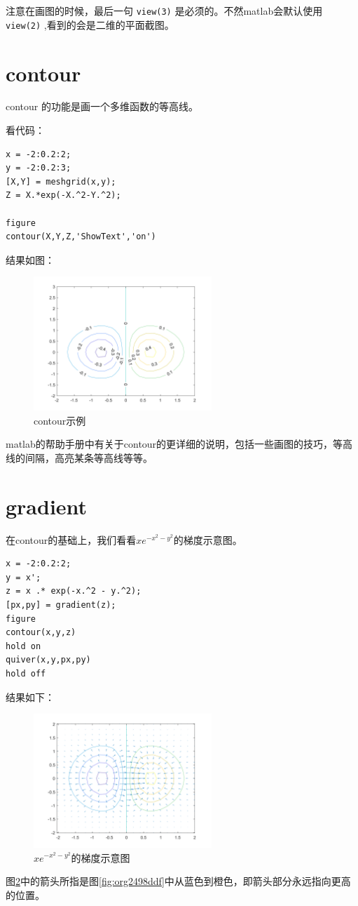 \documentclass[10pt,a4paper,UTF8]{article}
\begin{document}
注意在画图的时候，最后一句 \texttt{view(3)} 是必须的。不然matlab会默认使用 \texttt{view(2)} ,看到的会是二维的平面截图。

\section{contour}
\label{sec:orga28b7ee}


contour 的功能是画一个多维函数的等高线。

看代码：
\lstset{language=matlab,label= ,caption= ,captionpos=b,firstnumber=1,numbers=left}
\begin{lstlisting}
x = -2:0.2:2;
y = -2:0.2:3;
[X,Y] = meshgrid(x,y);
Z = X.*exp(-X.^2-Y.^2);

figure
contour(X,Y,Z,'ShowText','on')
\end{lstlisting}

结果如图：
\begin{figure}[htbp]
\centering
\includegraphics[width=0.6\textwidth]{../../img/communication_matlab/20170708contour.png}
\caption{\label{fig:org2b7b2e3}
contour示例}
\end{figure}

matlab的帮助手册中有关于contour的更详细的说明，包括一些画图的技巧，等高线的间隔，高亮某条等高线等等。

\section{gradient}
\label{sec:org4bde28f}


在contour的基础上，我们看看\(xe^{-x^{2} - y^{2}}\)的梯度示意图。
\lstset{language=matlab,label= ,caption= ,captionpos=b,firstnumber=1,numbers=left}
\begin{lstlisting}
x = -2:0.2:2;
y = x';
z = x .* exp(-x.^2 - y.^2);
[px,py] = gradient(z);
figure
contour(x,y,z)
hold on
quiver(x,y,px,py)
hold off
\end{lstlisting}

结果如下：
\begin{figure}[htbp]
\centering
\includegraphics[width=0.6\textwidth]{../../img/communication_matlab/20170708gradient.png}
\caption{\label{fig:org11a1b3d}
\(xe^{-x^{2} - y^{2}}\)的梯度示意图}
\end{figure}

图\ref{fig:org11a1b3d}中的箭头所指是图\ref{fig:org2498ddf}中从蓝色到橙色，即箭头部分永远指向更高的位置。
\end{document}
